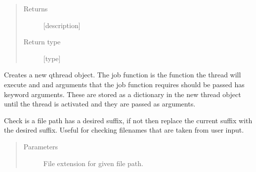 \documentclass[letterpaper,10pt,english]{sphinxmanual}
\begin{document}
\begin{fulllineitems}
\begin{fulllineitems}
\begin{quote}
\begin{description}
\begin{itemize}
\end{itemize}

\item[{Returns}] \leavevmode
{[}description{]}

\item[{Return type}] \leavevmode
{[}type{]}

\end{description}\end{quote}

\end{fulllineitems}


\begin{fulllineitems}
\label{\detokenize{polo.utils:polo.utils.io_utils.RunSerializer.make_thread}}
Creates a new qthread object. The job function is the
function the thread will execute and and arguments that the job
function requires should be passed has keyword arguments. These are
stored as a dictionary in the new thread object until the thread is
activated and they are passed as arguments.

\end{fulllineitems}


\begin{fulllineitems}
\label{\detokenize{polo.utils:polo.utils.io_utils.RunSerializer.path_suffix_checker}}
Check is a file path has a desired suffix, if not then replace the
current suffix with the desired suffix. Useful for checking filenames
that are taken from user input.
\begin{quote}\begin{description}
\item[{Parameters}] \leavevmode
{} \textendash{} File extension for given file path.


\end{description}
\end{quote}
\end{fulllineitems}
\end{fulllineitems}
\end{document}
